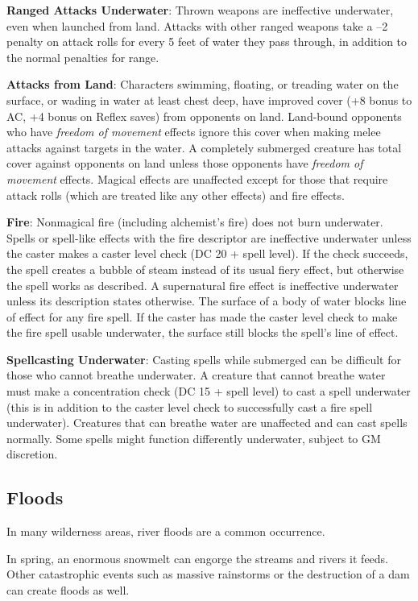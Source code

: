 				
\textbf{Ranged Attacks Underwater}: Thrown weapons are ineffective underwater, even when launched from land. Attacks with other ranged weapons take a --2 penalty on attack rolls for every 5 feet of water they pass through, in addition to the normal penalties for range. 
				
\textbf{Attacks from Land}: Characters swimming, floating, or treading water on the surface, or wading in water at least chest deep, have improved cover (+8 bonus to AC, +4 bonus on Reflex saves) from opponents on land. Land-bound opponents who have \textit{freedom of movement }effects ignore this cover when making melee attacks against targets in the water. A completely submerged creature has total cover against opponents on land unless those opponents have \textit{freedom of movement }effects. Magical effects are unaffected except for those that require attack rolls (which are treated like any other effects) and fire effects.
				
\textbf{Fire}: Nonmagical fire (including alchemist's fire) does not burn underwater. Spells or spell-like effects with the fire descriptor are ineffective underwater unless the caster makes a caster level check (DC 20 + spell level). If the check succeeds, the spell creates a bubble of steam instead of its usual fiery effect, but otherwise the spell works as described. A supernatural fire effect is ineffective underwater unless its description states otherwise. The surface of a body of water blocks line of effect for any fire spell. If the caster has made the caster level check to make the fire spell usable underwater, the surface still blocks the spell's line of effect.
				
\textbf{Spellcasting Underwater}: Casting spells while submerged can be difficult for those who cannot breathe underwater. A creature that cannot breathe water must make a concentration check (DC 15 + spell level) to cast a spell underwater (this is in addition to the caster level check to successfully cast a fire spell underwater). Creatures that can breathe water are unaffected and can cast spells normally. Some spells might function differently underwater, subject to GM discretion.
				
\subsection{Floods}

				
In many wilderness areas, river floods are a common occurrence.
				
In spring, an enormous snowmelt can engorge the streams and rivers it feeds. Other catastrophic events such as massive rainstorms or the destruction of a dam can create floods as well.
				
